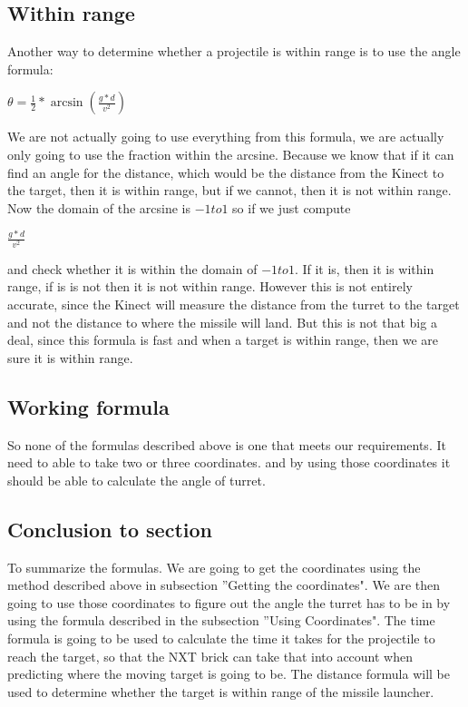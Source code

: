 \subsection*{Within range}
Another way to determine whether a projectile is within range is to use the angle formula:

\begin{math}\theta = \frac{1}{2}*\arcsin(\frac{g*d}{v^2})\end{math}

We are not actually going to use everything from this formula, we are actually only going to use the fraction within the arcsine. Because we know that if it can find an angle for the distance, which would be the distance from the Kinect to the target, then it is within range, but if we cannot, then it is not within range. Now the domain of the arcsine is $-1 to 1$ so if we just compute

\begin{math} \frac{g*d}{v^2} \end{math}

and check whether it is within the domain of $-1 to 1$. If it is, then it is within range, if is is not then it is not within range.
However this is not entirely accurate, since the Kinect will measure the distance from the turret to the target and not the distance to where the missile will land. But this is not that big a deal, since this formula is fast and when a target is within range, then we are sure it is within range.

\subsection*{Working formula}
So none of the formulas described above is one that meets our requirements. It need to able to take two or three coordinates. and by using those coordinates it should be able to calculate the angle of turret.

\subsection*{Conclusion to section}
To summarize the formulas. We are going to get the coordinates using the method described above in subsection ''Getting the coordinates". We are then going to use those coordinates to figure out the angle the turret has to be in by using the formula described in the subsection ''Using Coordinates". The time formula is going to be used to calculate the time it takes for the projectile to reach the target, so that the NXT brick can take that into account when predicting where the moving target is going to be. The distance formula will be used to determine whether the target is within range of the missile launcher.
